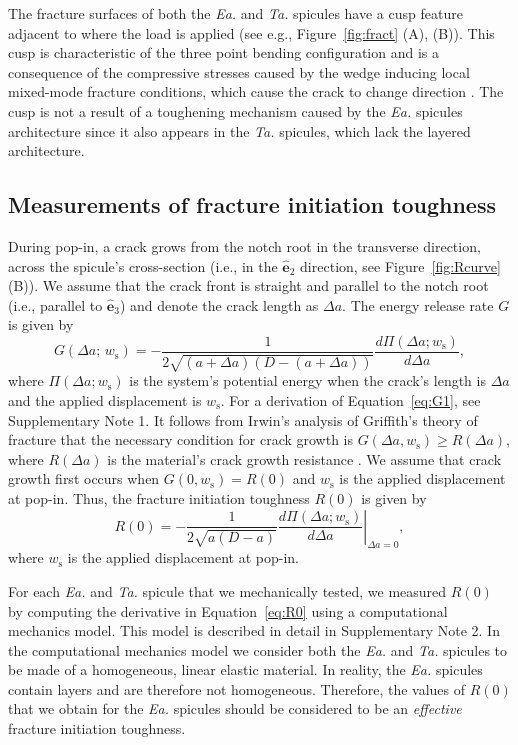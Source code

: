 \documentclass[12pt,onecolumn]{article}
\makeatletter
\newcommand{\ey}{\hat{\mathbf{e}}_2}
\newcommand{\ez}{\hat{\mathbf{e}}_3}
\newcommand{\TA}{\textit{Ta.\@}\xspace}
\newcommand{\EA}{\textit{Ea.\@}\xspace}
\makeatother
\begin{document}
The fracture surfaces of both the \EA and \TA spicules have a cusp feature adjacent to where the load is applied (see e.g., Figure~\ref{fig:fract} (A), (B)). This cusp is characteristic of the three point bending configuration \cite{quinn2007fractography} and is a consequence of the compressive stresses caused by the wedge inducing local mixed-mode fracture conditions, which cause the crack to change direction \cite{anderson2017fracture}. The cusp is not a result of a toughening mechanism caused by the \EA spicules architecture since it also appears in the \TA spicules, which lack the layered architecture.


\subsection*{Measurements of fracture initiation toughness}
\label{sec:Gc}
During pop-in, a crack grows from the notch root in the transverse direction, across the spicule's cross-section (i.e., in the $\ey$ direction, see Figure~\ref{fig:Rcurve} (B)). We assume that the crack front is straight and parallel to the notch root (i.e., parallel to $\ez$) and denote the crack length as $\Delta a$. The energy release rate $G$ is given by
%
\begin{equation}
    \label{eq:G1}
    G(\Delta a;\,w_\mathrm{s})=-\frac{1}{2\sqrt{(a+\Delta a)(D-(a+\Delta a))}}\frac{d\Pi(\Delta a; w_\mathrm{s})}{d\Delta a },
\end{equation}
%
where $\Pi(\Delta a;w_\mathrm{s})$ is the system's potential energy when the crack's length is $\Delta a$ and the applied displacement is $w_\mathrm{s}$. For a derivation of Equation~\eqref{eq:G1}, see Supplementary Note 1. It follows from Irwin's analysis of Griffith's theory of fracture that the necessary condition for crack growth is $G(\Delta a,w_\mathrm{s})\geq R(\Delta a)$, where $R(\Delta a)$ is the material's crack growth resistance \cite{anderson2017fracture}. We assume that crack growth first occurs when $G(0,w_\mathrm{s})=R(0)$ and $w_\mathrm{s}$ is the applied displacement at pop-in. Thus, the fracture initiation toughness $R(0)$ is given by
%
\begin{equation}
    \label{eq:R0}
    R(0)=-\frac{1}{2\sqrt{a(D-a)}} \left.\frac{d\Pi(\Delta a; w_\mathrm{s})}{d\Delta a }\right\vert_{\Delta a=0},
\end{equation}
%
where $w_\mathrm{s}$ is the applied displacement at pop-in.

For each \EA and \TA spicule that we mechanically tested, we measured $R(0)$ by computing the derivative in Equation~\eqref{eq:R0} using a computational mechanics model. This model is described in detail in Supplementary Note 2. In the computational mechanics model we consider both the \EA and \TA spicules to be made of a homogeneous, linear elastic material. In reality, the \EA spicules contain layers and are therefore not homogeneous. Therefore, the values of $R(0)$ that we obtain for the \EA spicules should be considered to be an \emph{effective} fracture initiation toughness.
\end{document}
